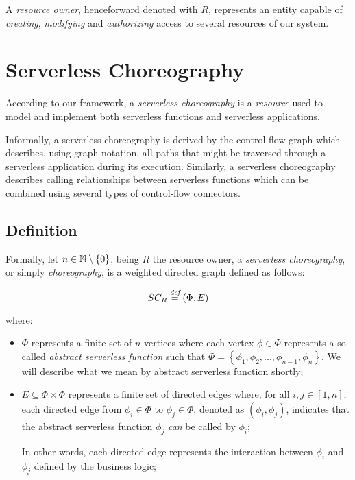 A \textit{resource owner}, henceforward denoted with $R$, represents an entity capable of \textit{creating}, \textit{modifying} and \textit{authorizing} access to several resources of our system.

\section{Serverless Choreography}

According to our framework, a \textit{serverless choreography} is a \textit{resource} used to model and implement both serverless functions and serverless applications.

Informally, a serverless choreography is derived by the control-flow graph which describes, using graph notation, all paths that might be traversed through a serverless application during its execution. Similarly, a serverless choreography describes calling relationships between serverless functions which can be combined using several types of control-flow connectors.

\subsection{Definition}

Formally, let $n \in \mathbb{N} \setminus \left\lbrace 0 \right\rbrace $, being $R$ the resource owner, a \textit{serverless choreography}, or simply \textit{choreography}, is a weighted directed graph defined as follows:

\begin{equation}
	SC_R \overset{\textit{def}}{=} (\Phi,E)
\end{equation}

where:

\begin{itemize}
	\item $\Phi$ represents a finite set of $n$ vertices where each vertex $\phi \in \Phi$ represents a so-called \textit{abstract serverless function} such that $\Phi = \left\lbrace \phi_1, \phi_2, ..., \phi_{n-1}, \phi_n \right\rbrace$. We will describe what we mean by abstract serverless function shortly;
	
	\item $E \subseteq \Phi \times \Phi $ represents a finite set of directed edges where, for all $i,j \in \left[ 1, n \right]$, each directed edge from $\phi_i \in \Phi$ to $\phi_j \in \Phi$, denoted as $\left( \phi_i, \phi_j \right)$, indicates that the abstract serverless function $\phi_j$ \textit{can} be called by $\phi_i$;
	
	In other words, each directed edge represents the interaction between $\phi_i$ and $\phi_j$ defined by the business logic;
\end{itemize} 

